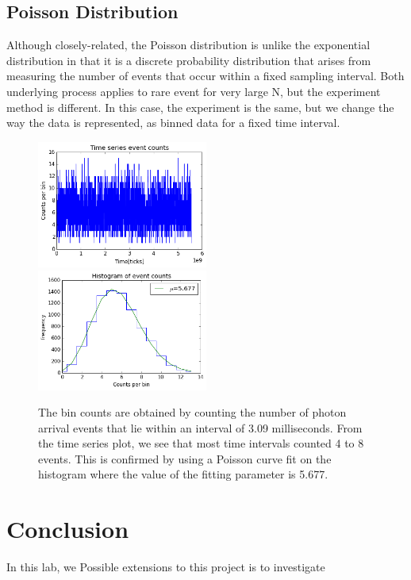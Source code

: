 \documentclass[authoryear, 12pt,5p, times]{elsarticle}
\begin{document}
 	\subsection{Poisson Distribution}
 	Although closely-related, the Poisson distribution is unlike the exponential distribution in that it is a discrete probability distribution that arises from measuring the number of events that occur within a fixed sampling interval. Both underlying process applies to rare event for very large N, but the experiment method is different. In this case, the experiment is the same, but we change the way the data is represented, as binned data for a fixed time interval.
 	 	\begin{figure}[h]
			\includegraphics[width=0.5\textwidth]{figures/time_series}
			\includegraphics[width=0.5\textwidth]{figures/poisson_histo}
			\caption{The bin counts are obtained by counting the number of photon arrival events that lie within an interval of 3.09 milliseconds. From the time series plot, we see that most time intervals counted 4 to 8 events. This is confirmed by using a Poisson curve fit on the histogram where the value of the fitting parameter is 5.677.}
			\label{poisson}
		\end{figure}
\section{Conclusion\label{end}}
In this lab, we 
Possible extensions to this project is to investigate 
\end{document}
